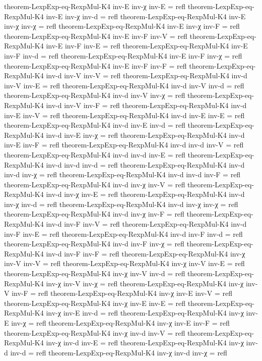 \documentclass[11pt,a4paper]{article}
\begin{document}
\begin{code}
theorem-LexpExp-eq-RexpMul-K4 inv-E inv-χ inv-E = refl
theorem-LexpExp-eq-RexpMul-K4 inv-E inv-χ inv-d = refl
theorem-LexpExp-eq-RexpMul-K4 inv-E inv-χ inv-χ = refl
theorem-LexpExp-eq-RexpMul-K4 inv-E inv-χ inv-F = refl
theorem-LexpExp-eq-RexpMul-K4 inv-E inv-F inv-V = refl
theorem-LexpExp-eq-RexpMul-K4 inv-E inv-F inv-E = refl
theorem-LexpExp-eq-RexpMul-K4 inv-E inv-F inv-d = refl
theorem-LexpExp-eq-RexpMul-K4 inv-E inv-F inv-χ = refl
theorem-LexpExp-eq-RexpMul-K4 inv-E inv-F inv-F = refl
theorem-LexpExp-eq-RexpMul-K4 inv-d inv-V inv-V = refl
theorem-LexpExp-eq-RexpMul-K4 inv-d inv-V inv-E = refl
theorem-LexpExp-eq-RexpMul-K4 inv-d inv-V inv-d = refl
theorem-LexpExp-eq-RexpMul-K4 inv-d inv-V inv-χ = refl
theorem-LexpExp-eq-RexpMul-K4 inv-d inv-V inv-F = refl
theorem-LexpExp-eq-RexpMul-K4 inv-d inv-E inv-V = refl
theorem-LexpExp-eq-RexpMul-K4 inv-d inv-E inv-E = refl
theorem-LexpExp-eq-RexpMul-K4 inv-d inv-E inv-d = refl
theorem-LexpExp-eq-RexpMul-K4 inv-d inv-E inv-χ = refl
theorem-LexpExp-eq-RexpMul-K4 inv-d inv-E inv-F = refl
theorem-LexpExp-eq-RexpMul-K4 inv-d inv-d inv-V = refl
theorem-LexpExp-eq-RexpMul-K4 inv-d inv-d inv-E = refl
theorem-LexpExp-eq-RexpMul-K4 inv-d inv-d inv-d = refl
theorem-LexpExp-eq-RexpMul-K4 inv-d inv-d inv-χ = refl
theorem-LexpExp-eq-RexpMul-K4 inv-d inv-d inv-F = refl
theorem-LexpExp-eq-RexpMul-K4 inv-d inv-χ inv-V = refl
theorem-LexpExp-eq-RexpMul-K4 inv-d inv-χ inv-E = refl
theorem-LexpExp-eq-RexpMul-K4 inv-d inv-χ inv-d = refl
theorem-LexpExp-eq-RexpMul-K4 inv-d inv-χ inv-χ = refl
theorem-LexpExp-eq-RexpMul-K4 inv-d inv-χ inv-F = refl
theorem-LexpExp-eq-RexpMul-K4 inv-d inv-F inv-V = refl
theorem-LexpExp-eq-RexpMul-K4 inv-d inv-F inv-E = refl
theorem-LexpExp-eq-RexpMul-K4 inv-d inv-F inv-d = refl
theorem-LexpExp-eq-RexpMul-K4 inv-d inv-F inv-χ = refl
theorem-LexpExp-eq-RexpMul-K4 inv-d inv-F inv-F = refl
theorem-LexpExp-eq-RexpMul-K4 inv-χ inv-V inv-V = refl
theorem-LexpExp-eq-RexpMul-K4 inv-χ inv-V inv-E = refl
theorem-LexpExp-eq-RexpMul-K4 inv-χ inv-V inv-d = refl
theorem-LexpExp-eq-RexpMul-K4 inv-χ inv-V inv-χ = refl
theorem-LexpExp-eq-RexpMul-K4 inv-χ inv-V inv-F = refl
theorem-LexpExp-eq-RexpMul-K4 inv-χ inv-E inv-V = refl
theorem-LexpExp-eq-RexpMul-K4 inv-χ inv-E inv-E = refl
theorem-LexpExp-eq-RexpMul-K4 inv-χ inv-E inv-d = refl
theorem-LexpExp-eq-RexpMul-K4 inv-χ inv-E inv-χ = refl
theorem-LexpExp-eq-RexpMul-K4 inv-χ inv-E inv-F = refl
theorem-LexpExp-eq-RexpMul-K4 inv-χ inv-d inv-V = refl
theorem-LexpExp-eq-RexpMul-K4 inv-χ inv-d inv-E = refl
theorem-LexpExp-eq-RexpMul-K4 inv-χ inv-d inv-d = refl
theorem-LexpExp-eq-RexpMul-K4 inv-χ inv-d inv-χ = refl

\end{code}
\end{document}
